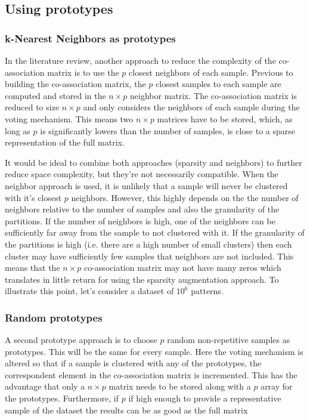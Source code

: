 \subsection{Using prototypes}

\subsubsection{k-Nearest Neighbors as prototypes}
In the literature review, another approach to reduce the complexity of the co-association matrix is to use the $p$ closest neighbors of each sample. Previous to building the co-association matrix, the $p$ closest samples to each sample are computed and stored in the $n \times p$ neighbor matrix. The co-association matrix is reduced to size $n \times p$ and only considers the neighbors of each sample during the voting mechanism. This means two $n \times p$ matrices have to be stored, which, as long as $p$ is significantly lowers than the number of samples, is close to a sparse representation of the full matrix.

It would be ideal to combine both approaches (sparsity and neighbors) to further reduce space complexity, but they're not necessarily compatible. When the neighbor approach is used, it is unlikely that a sample will never be clustered with it's closest $p$ neighbors. However, this highly depends on the the number of neighbors relative to the number of samples and also the granularity of the partitions. If the number of neighbors is high, one of the neighbors can be sufficiently far away from the sample to not clustered with it. If the granularity of the partitions is high (i.e. there are a high number of small clusters) then each cluster may have sufficiently few samples that neighbors are not included. This means that the $n \times p$ co-association matrix may not have many zeros which translates in little return for using the sparsity augmentation approach. To illustrate this point, let's consider a dataset of $10^6$ patterns. 


\subsubsection{Random prototypes}
A second prototype approach is to choose $p$ random non-repetitive samples as prototypes. This will be the same for every sample.
Here the voting mechanism is altered so that if a sample is clustered with any of the prototypes, the correspondent element in the co-association matrix is incremented. This has the advantage that only a $n \times p$ matrix needs to be stored along with a $p$ array for the prototypes.
Furthermore, if $p$ if high enough to provide a representative sample of the dataset the results can be as good as the full matrix

